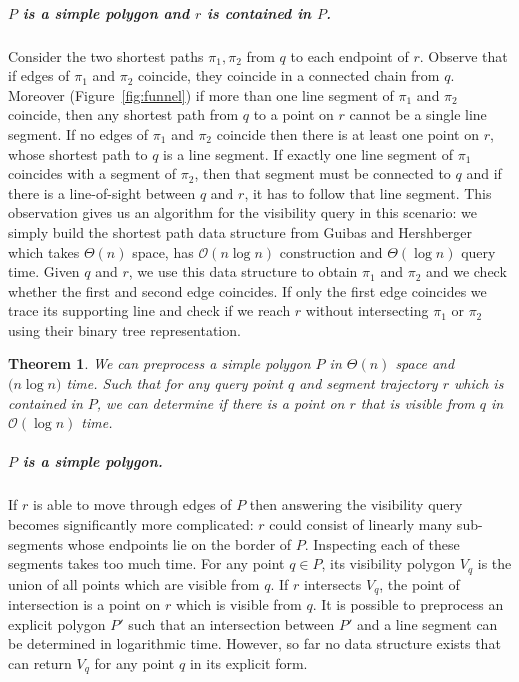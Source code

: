 \documentclass[a4paper, UKenglish]{paper}
\newtheorem{theorem}{Theorem}
\begin{document}
\subparagraph{$P$ is a simple polygon and $r$ is contained in $P$.}
Consider the two shortest paths $\pi_1, \pi_2$ from $q$ to  each endpoint of $r$. Observe that if edges of $\pi_1$ and $\pi_2$ coincide, they coincide in a connected chain from $q$. Moreover (Figure~\ref{fig:funnel}) if more than one line segment of $\pi_1$ and $\pi_2$ coincide, then any shortest path from $q$ to a point on $r$ cannot be a single line segment. If no edges of $\pi_1$ and $\pi_2$ coincide then there is at least one point on $r$, whose shortest path to $q$ is a line segment. If exactly one line segment of $\pi_1$ coincides with a segment of $\pi_2$, then that segment must be connected to $q$ and if there is a line-of-sight between $q$ and $r$, it has to follow that line segment. This observation gives us an algorithm for the visibility query in this scenario: we simply build the shortest path data structure from Guibas and Hershberger which takes $\Theta(n)$ space, has $\mathcal{O}(n \log n)$ construction and $\Theta(\log n)$ query time. Given $q$ and $r$, we use this data structure to obtain $\pi_1$ and $\pi_2$ and we check whether the first and second edge coincides. If only the first edge coincides we trace its supporting line and check if we reach $r$ without intersecting $\pi_1$ or $\pi_2$ using their binary tree representation.

\begin{theorem}
We can preprocess a simple polygon $P$ in $\Theta(n)$ space and $\mathcal(n \log n)$ time. Such that for any query point $q$ and segment trajectory $r$ which is contained in $P$, we can determine if there is a point on $r$ that is visible from $q$ in $\mathcal{O}(\log n)$ time.
\end{theorem}




\subparagraph{$P$ is a simple polygon.}
If $r$ is able to move through edges of $P$ then answering the visibility query becomes significantly more complicated: $r$ could consist of linearly many sub-segments whose endpoints lie on the border of $P$. Inspecting each of these segments takes too much time. For any point $q \in P$, its visibility polygon $V_q$ is the union of all points which are visible from $q$. If $r$ intersects $V_q$, the point of intersection is a point on $r$ which is visible from $q$. It is possible to preprocess an explicit polygon $P'$ such that an intersection between $P'$ and a line segment can be determined in logarithmic time. However, so far no data structure exists that can return $V_q$ for any point $q$ in its explicit form.
\end{document}
